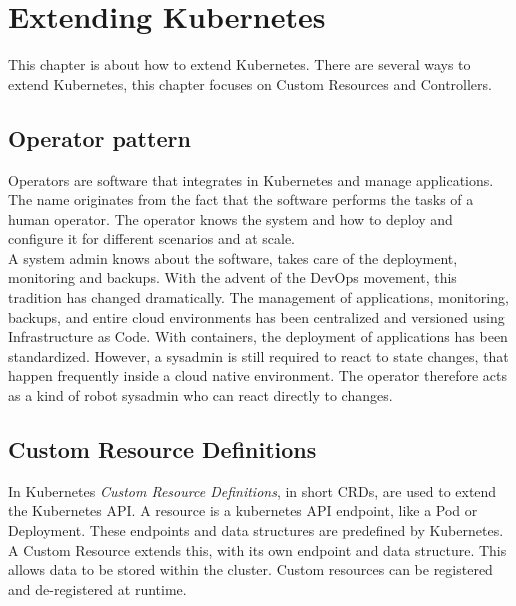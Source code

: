 \chapter{Extending Kubernetes}

This chapter is about how to extend Kubernetes.
There are several ways to extend Kubernetes, this chapter focuses on Custom Resources and Controllers.

\section{Operator pattern}\label{sec:operator-pattern}

Operators are software that integrates in Kubernetes and manage applications.
The name originates from the fact that the software performs the tasks of a human operator.
The operator knows the system and how to deploy and configure it for different scenarios and at scale.~\cite{KUBERNETES-OPERATOR}
\\
A system admin knows about the software, takes care of the deployment, monitoring and backups.
With the advent of the DevOps movement, this tradition has changed dramatically.
The management of applications, monitoring, backups, and entire cloud environments has been centralized and versioned using Infrastructure as Code.
With containers, the deployment of applications has been standardized.
However, a sysadmin is still required to react to state changes, that happen frequently inside a cloud native environment.
The operator therefore acts as a kind of robot sysadmin who can react directly to changes.~\cite{RED-HAT-OPERATOR}

\section{Custom Resource Definitions}\label{sec:custom-resource-definitions}

In Kubernetes \textit{Custom Resource Definitions}, in short CRDs, are used to extend the Kubernetes API.
A resource is a kubernetes API endpoint, like a Pod or Deployment.
These endpoints and data structures are predefined by Kubernetes.
A Custom Resource extends this, with its own endpoint and data structure.
This allows data to be stored within the cluster.
Custom resources can be registered and de-registered at runtime.~\cite{KUBERNETES-CRD}

